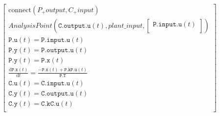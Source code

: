 \begin{equation}
\left[
\begin{array}{c}
\mathrm{connect}\left( P_{+}output, C_{+}input \right) \\
AnalysisPoint\left( \mathtt{C.output.u}\left( t \right), plant\_input, \left[
\begin{array}{c}
\mathtt{P.input.u}\left( t \right) \\
\end{array}
\right] \right) \\
\mathtt{P.u}\left( t \right) = \mathtt{P.input.u}\left( t \right) \\
\mathtt{P.y}\left( t \right) = \mathtt{P.output.u}\left( t \right) \\
\mathtt{P.y}\left( t \right) = \mathtt{P.x}\left( t \right) \\
\frac{\mathrm{d} \mathtt{P.x}\left( t \right)}{\mathrm{d}t} = \frac{ - \mathtt{P.x}\left( t \right) + \mathtt{P.k} \mathtt{P.u}\left( t \right)}{\mathtt{P.T}} \\
\mathtt{C.u}\left( t \right) = \mathtt{C.input.u}\left( t \right) \\
\mathtt{C.y}\left( t \right) = \mathtt{C.output.u}\left( t \right) \\
\mathtt{C.y}\left( t \right) = \mathtt{C.k} \mathtt{C.u}\left( t \right) \\
\end{array}
\right]
\end{equation}
